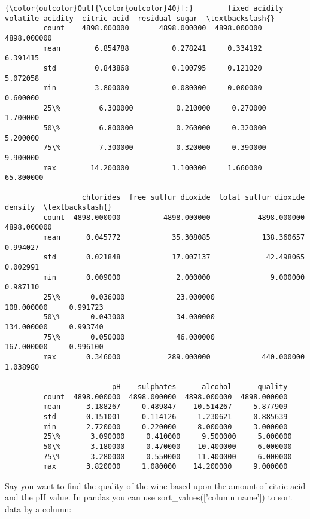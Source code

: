 \documentclass[11pt]{article}
\begin{document}
\begin{Verbatim}[commandchars=\\\{\}]
{\color{outcolor}Out[{\color{outcolor}40}]:}        fixed acidity  volatile acidity  citric acid  residual sugar  \textbackslash{}
         count    4898.000000       4898.000000  4898.000000     4898.000000   
         mean        6.854788          0.278241     0.334192        6.391415   
         std         0.843868          0.100795     0.121020        5.072058   
         min         3.800000          0.080000     0.000000        0.600000   
         25\%         6.300000          0.210000     0.270000        1.700000   
         50\%         6.800000          0.260000     0.320000        5.200000   
         75\%         7.300000          0.320000     0.390000        9.900000   
         max        14.200000          1.100000     1.660000       65.800000   
         
                  chlorides  free sulfur dioxide  total sulfur dioxide      density  \textbackslash{}
         count  4898.000000          4898.000000           4898.000000  4898.000000   
         mean      0.045772            35.308085            138.360657     0.994027   
         std       0.021848            17.007137             42.498065     0.002991   
         min       0.009000             2.000000              9.000000     0.987110   
         25\%       0.036000            23.000000            108.000000     0.991723   
         50\%       0.043000            34.000000            134.000000     0.993740   
         75\%       0.050000            46.000000            167.000000     0.996100   
         max       0.346000           289.000000            440.000000     1.038980   
         
                         pH    sulphates      alcohol      quality  
         count  4898.000000  4898.000000  4898.000000  4898.000000  
         mean      3.188267     0.489847    10.514267     5.877909  
         std       0.151001     0.114126     1.230621     0.885639  
         min       2.720000     0.220000     8.000000     3.000000  
         25\%       3.090000     0.410000     9.500000     5.000000  
         50\%       3.180000     0.470000    10.400000     6.000000  
         75\%       3.280000     0.550000    11.400000     6.000000  
         max       3.820000     1.080000    14.200000     9.000000  
\end{Verbatim}
            
    Say you want to find the quality of the wine based upon the amount of
citric acid and the pH value. In pandas you can use
sort\_values({[}'column name'{]}) to sort data by a column:
\end{document}

